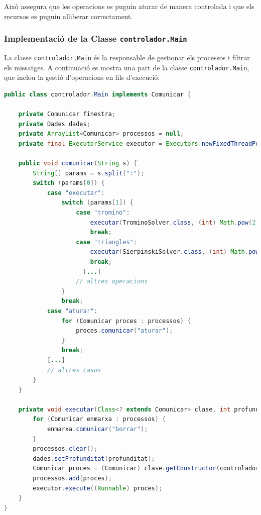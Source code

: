 \documentclass{ieeetj}
\begin{document}
Això assegura que les operacions es puguin aturar de manera controlada i que els recursos es puguin alliberar correctament.
\subsubsection{Implementació de la Classe \texttt{controlador.Main}}
La classe \texttt{controlador.Main} és la responsable de gestionar els processos i filtrar els missatges. A continuació es mostra una part de la classe \texttt{controlador.Main}, que inclou la gestió d'operacions en fils d'execució:

\begin{lstlisting}[language=Java, basicstyle=\ttfamily\small]
public class controlador.Main implements Comunicar {

    private Comunicar finestra;
    private Dades dades;
    private ArrayList<Comunicar> processos = null;
    private final ExecutorService executor = Executors.newFixedThreadPool(16);

    public void comunicar(String s) {
        String[] params = s.split(":");
        switch (params[0]) {
            case "executar":
                switch (params[1]) {
                    case "tromino":
                        executar(TrominoSolver.class, (int) Math.pow(2, Integer.parseInt(params[2])));
                        break;
                    case "triangles":
                        executar(SierpinskiSolver.class, (int) Math.pow(2, Integer.parseInt(params[2]) - 1));
                        break;
                      [...]
                    // altres operacions
                }
                break;
            case "aturar":
                for (Comunicar proces : processos) {
                    proces.comunicar("aturar");
                }
                break;
            [...]
            // altres casos
        }
    }

    private void executar(Class<? extends Comunicar> clase, int profunditat) throws NoSuchMethodException, InvocationTargetException, InstantiationException, IllegalAccessException {
        for (Comunicar enmarxa : processos) {
            enmarxa.comunicar("borrar");
        }
        processos.clear();
        dades.setProfunditat(profunditat);
        Comunicar proces = (Comunicar) clase.getConstructor(controlador.Main.class, Dades.class).newInstance(this, dades);
        processos.add(proces);
        executor.execute((Runnable) proces);
    }
}
\end{lstlisting}
\end{document}
